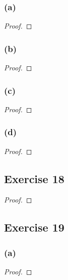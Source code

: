 \documentclass[14pt]{extarticle}
\begin{document}
\subsubsection{(a)}

\begin{proof}

\end{proof}

\subsubsection{(b)}

\begin{proof}

\end{proof}

\subsubsection{(c)}

\begin{proof}

\end{proof}

\subsubsection{(d)}

\begin{proof}

\end{proof}

\subsection{Exercise 18}

\begin{proof}

\end{proof}

\subsection{Exercise 19}

\subsubsection{(a)}

\begin{proof}

\end{proof}
\end{document}
